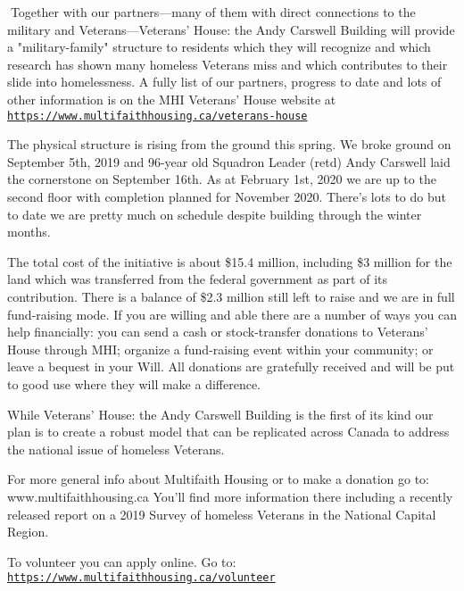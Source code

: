 Together with our partners---many of them with direct connections to
the military and Veterans---Veterans' House: the Andy Carswell Building
will provide a "military-family" structure to residents which they will
recognize and which research has shown many homeless Veterans miss and
which contributes to their slide into homelessness. A fully list of our
partners, progress to date and lots of other information is on the MHI
Veterans' House website at
{\normalfont\color{blue}\texttt{\url{https://www.multifaithhousing.ca/veterans-house}}}


The physical structure is rising from the ground this spring. We broke
ground on September 5th, 2019 and 96-year old Squadron Leader (retd)
Andy Carswell laid the cornerstone on September 16th. As at February
1st, 2020 we are up to the second floor with completion planned for
November 2020. There's lots to do but to date we are pretty much on
schedule despite building through the winter months.

The total cost of the initiative is about \$15.4 million, including \$3
million for the land which was transferred from the federal government
as part of its contribution. There is a balance of \$2.3 million still
left to raise and we are in full fund-raising mode. If you are willing
and able there are a number of ways you can help financially: you can
send a cash or stock-transfer donations to Veterans' House through MHI;
organize a fund-raising event within your community; or leave a bequest
in your Will. All donations are gratefully received and will be put to
good use where they will make a difference.

While Veterans' House: the Andy Carswell Building is the first of its
kind our plan is to create a robust model that can be replicated across
Canada to address the national issue of homeless Veterans.

For more general info about Multifaith Housing or to make a donation go
to: www.multifaithhousing.ca You'll find more information there
including a recently released report on a 2019 Survey of homeless
Veterans in the National Capital Region.

To volunteer you can apply online. Go to:
{\normalfont\color{blue}\texttt{\url{https://www.multifaithhousing.ca/volunteer}}}

